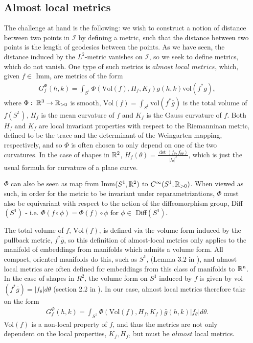 \subsection{Almost local metrics}
\label{sec:al-metrics}

The challenge at hand is the following: we wish to construct a notion of distance between two points in $\mathcal{I}$ by defining a metric, such that the distance between two points is the length of geodesics between the points. As we have seen, the distance induced by the $L^2$-metric vanishes on $\mathcal{I}$, so we seek to define metrics, which do not vanish. One type of such metrics is $\textit{almost local metrics}$, which, given $f \in$ Imm, are metrics of the form
\begin{align*}
G_f^\Phi (h,k) = \int_{S^1} \Phi(\text{Vol}(f), H_f, K_f) \bar{g}(h,k) \text{vol}(f^* \bar{g}),
\end{align*}
where $\Phi: \; \mathbb{R}^3 \rightarrow \mathbb{R}_{> 0}$ is smooth, $\text{Vol}(f) = \int_{S^1} \text{vol}(f^* \bar{g})$ is the total volume of $f(S^1)$, $H_f$ is the mean curvature of $f$ and $K_f$ is the Gauss curvature of $f$. Both $H_f$ and $K_f$ are local invariant properties with respect to the Riemanninan metric, defined to be the trace and the determinant of the Weingarten mapping, respectively, and so $\Phi$ is often chosen to only depend on one of the two curvatures. In the case of shapes in $\mathbb{R}^2$, $H_f(\theta) = \frac{\det(f_\theta, f_{\theta \theta})}{\left| f_\theta \right| ^3}$, which is just the usual formula for curvature of a plane curve.

$\Phi$ can also be seen as map from Imm$(S^1, \mathbb{R}^2)$ to $C^\infty (S^1, \mathbb{R}_{> 0})$. When viewed as such, in order for the metric to be invariant under reparametrizations, $\Phi$ must also be equivariant with respect to the action of the diffeomorphism group, Diff$(S^1)$ - i.e. $\Phi(f \circ \phi) = \Phi(f) \circ \phi$ for $\phi \in$ Diff$(S^1)$.

The total volume of $f$, $\text{Vol}(f)$, is defined via the volume form induced by the pullback metric, $f^*\bar{g}$, so this definition of almost-local metrics only applies to the manifold of embeddings from manifolds which admits a volume form. All compact, oriented manifolds do this, such as $S^1$, (Lemma $3.2$ in \cite{lee2006riemannian}), and almost local metrics are often defined for embeddings from this class of manifolds to $\mathbb{R}^n$. In the case of shapes in $R^2$, the volume form on $S^1$ induced by $f$ is given by vol$(f^*\bar{g}) = \left| f_\theta \right| d \theta$ (section 2.2 in \cite{michor2003riemannian}). In our case, almost local metrics therefore take on the form
\begin{align*}
G_f^\Phi (h,k) = \int_{S^1} \Phi(\text{Vol}(f), H_f, K_f) \bar{g}(h,k) \left| f_\theta \right| d \theta.
\end{align*}
Vol$(f)$ is a non-local property of $f$, and thus the metrics are not only dependent on the local properties, $K_f, H_f$, but must be $\textit{almost}$ local metrics.


